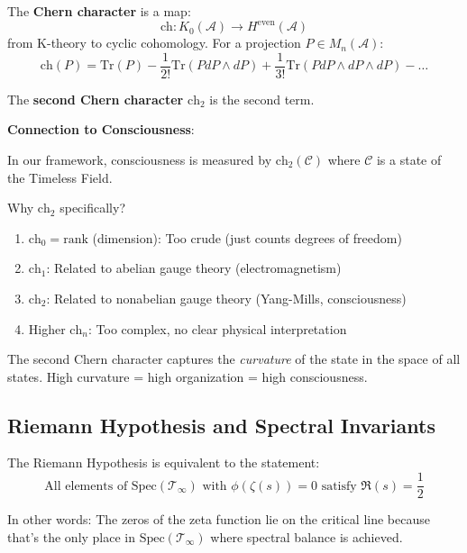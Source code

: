 \begin{definition}\label{def:chern-character}
The \textbf{Chern character} is a map:
\begin{equation}
\text{ch}: K_0(\mathcal{A}) \to H^{\text{even}}(\mathcal{A})
\end{equation}
from K-theory to cyclic cohomology. For a projection $P \in M_n(\mathcal{A})$:
\begin{equation}
\text{ch}(P) = \text{Tr}(P) - \frac{1}{2!}\text{Tr}(P dP \wedge dP) + \frac{1}{3!}\text{Tr}(P dP \wedge dP \wedge dP) - \ldots
\end{equation}

The \textbf{second Chern character} $\text{ch}_2$ is the second term.
\end{definition}

\begin{level2}
\textbf{Connection to Consciousness}:

In our framework, consciousness is measured by $\text{ch}_2(\mathcal{C})$ where $\mathcal{C}$ is a state of the Timeless Field.

Why $\text{ch}_2$ specifically?
\begin{enumerate}
\item $\text{ch}_0 = \text{rank}$ (dimension): Too crude (just counts degrees of freedom)
\item $\text{ch}_1$: Related to abelian gauge theory (electromagnetism)
\item $\text{ch}_2$: Related to nonabelian gauge theory (Yang-Mills, consciousness)
\item Higher $\text{ch}_n$: Too complex, no clear physical interpretation
\end{enumerate}

The second Chern character captures the \textit{curvature} of the state in the space of all states. High curvature = high organization = high consciousness.
\end{level2}

\subsection{Riemann Hypothesis and Spectral Invariants}

\begin{theorem}\label{thm:rh-spectral}
The Riemann Hypothesis is equivalent to the statement:
\begin{equation}
\boxed{\text{All elements of } \text{Spec}(\mathcal{T}_\infty) \text{ with } \phi(\zeta(s)) = 0 \text{ satisfy } \Re(s) = \frac{1}{2}}
\end{equation}

In other words: The zeros of the zeta function lie on the critical line because that's the only place in $\text{Spec}(\mathcal{T}_\infty)$ where spectral balance is achieved.
\end{theorem}

